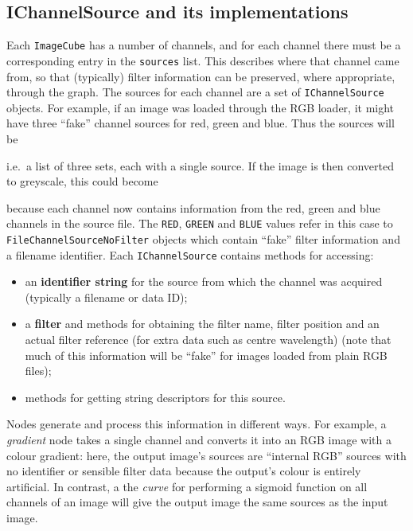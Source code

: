 \subsection{IChannelSource and its implementations}
Each \texttt{ImageCube} has a number of channels, and for each channel there must be a corresponding
entry in the \texttt{sources} list. This describes where that channel came from, so that (typically) filter
information can be preserved, where appropriate, through the graph. The sources for each channel are a set
of \texttt{IChannelSource} objects. For example, if an image was loaded through the RGB loader, it might
have three ``fake'' channel sources for red, green and blue. Thus the sources will be 
\begin{v}
\end{v}
i.e.\ a list of three sets, each with a single source.
If the image is then converted to greyscale, this could
become
\begin{v}
\end{v}
because each channel now contains information from the red, green and blue channels in the source file.
The \texttt{RED}, \texttt{GREEN} and \texttt{BLUE} values refer in this case to \texttt{FileChannelSourceNoFilter} objects
which contain ``fake'' filter information and a filename identifier.
Each \texttt{IChannelSource} contains methods for accessing:
\begin{itemize}
\item an \textbf{identifier string} for the source from which the channel was acquired (typically a filename or data ID);
\item a \textbf{filter} and methods for obtaining the filter name, filter position and an actual filter reference (for extra data such as centre wavelength) (note
that much of this information will be ``fake'' for images loaded from plain RGB files);
\item methods for getting string descriptors for this source.
\end{itemize}

Nodes generate and process this information in different ways. For example, a \emph{gradient} node takes a single channel and converts it into an RGB image with
a colour gradient: here, the output image's sources are ``internal RGB'' sources with no identifier or sensible filter data because the output's colour
is entirely artificial. In contrast, a the \emph{curve} for performing a sigmoid function on all channels of an image will give the output image the
same sources as the input image.


